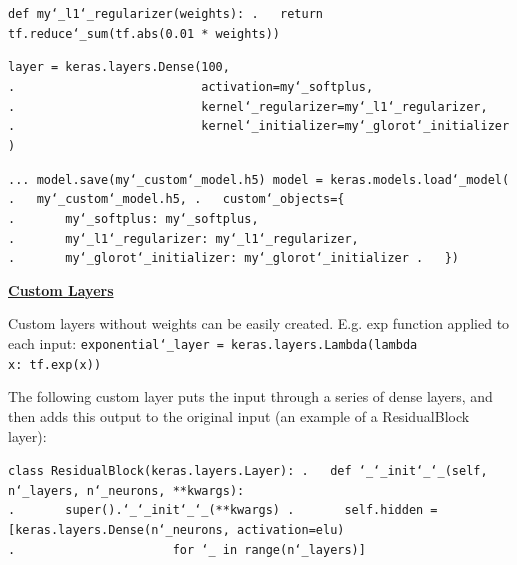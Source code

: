 \texttt{def my\char`_l1\char`_regularizer(weights):\newline
.~~~return tf.reduce\char`_sum(tf.abs(0.01 * weights))}

\texttt{layer = keras.layers.Dense(100,\newline
.~~~~~~~~~~~~~~~~~~~~~~~~~~activation=my\char`_softplus,\newline
.~~~~~~~~~~~~~~~~~~~~~~~~~~kernel\char`_regularizer=my\char`_l1\char`_regularizer,\newline
.~~~~~~~~~~~~~~~~~~~~~~~~~~kernel\char`_initializer=my\char`_glorot\char`_initializer)}

\texttt{...\newline
model.save(\textquotesingle my\char`_custom\char`_model.h5\textquotesingle)\newline
model = keras.models.load\char`_model(\newline
.~~~\textquotesingle my\char`_custom\char`_model.h5\textquotesingle,\newline
.~~~custom\char`_objects=\{\newline
.~~~~~~~\textquotesingle my\char`_softplus\textquotesingle:~my\char`_softplus,\newline
.~~~~~~~\textquotesingle my\char`_l1\char`_regularizer\textquotesingle:~my\char`_l1\char`_regularizer,\newline
.~~~~~~~\textquotesingle my\char`_glorot\char`_initializer\textquotesingle:~my\char`_glorot\char`_initializer\newline
.~~~\})\newline
}\newline

\textbf{\underline{Custom Layers}}


Custom layers without weights can be easily created.
E.g. exp function applied to each input:\newline
\texttt{exponential\char`_layer = keras.layers.Lambda(lambda x:~tf.exp(x))}\newline

The following custom layer puts the input through a series of dense layers,
and then adds this output to the original input (an example of a ResidualBlock layer):

\texttt{class ResidualBlock(keras.layers.Layer):\newline
.~~~def \char`_\char`_init\char`_\char`_(self, n\char`_layers, n\char`_neurons, **kwargs):\newline
.~~~~~~~super().\char`_\char`_init\char`_\char`_(**kwargs)\newline
.~~~~~~~self.hidden = [keras.layers.Dense(n\char`_neurons, activation=\textquotesingle elu\textquotesingle)\newline
.~~~~~~~~~~~~~~~~~~~~~~for \char`_ in range(n\char`_layers)]}

